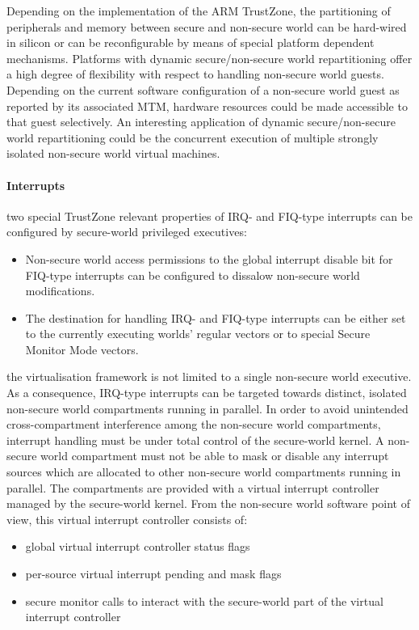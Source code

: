 \documentclass{article}
\begin{document}
Depending on the implementation of the ARM TrustZone, the partitioning of peripherals and memory between secure and non-secure world can be hard-wired in silicon or can be reconfigurable by means of special platform dependent mechanisms. Platforms with dynamic secure/non-secure world repartitioning offer a high degree of flexibility with respect to handling non-secure world guests. Depending on the current software configuration of a non-secure world guest as reported by its associated MTM, hardware resources could be made accessible to that guest selectively. An interesting application of dynamic secure/non-secure world repartitioning could be the concurrent execution of multiple strongly isolated non-secure world virtual machines.

\paragraph{Interrupts}

two special TrustZone relevant properties of IRQ- and FIQ-type interrupts can be configured by secure-world privileged executives: \begin{itemize}
\item Non-secure world access permissions to the global interrupt disable bit for FIQ-type interrupts can be configured to dissalow non-secure world modifications.
\item The destination for handling IRQ- and FIQ-type interrupts can be either set to the currently executing worlds’ regular vectors or to special Secure Monitor Mode vectors.
\end{itemize}

the virtualisation framework is not limited to a single non-secure world executive. As a consequence, IRQ-type interrupts can be targeted towards distinct, isolated non-secure world compartments running in parallel. In order to avoid unintended cross-compartment interference among the non-secure world compartments, interrupt handling must be under total control of the secure-world kernel. A non-secure world compartment must not be able to mask or disable any interrupt sources which are allocated to other non-secure world compartments running in parallel. The compartments are provided with a virtual interrupt controller managed by the secure-world kernel. From the non-secure world software point of view, this virtual interrupt controller consists of:\begin{itemize}
\item global virtual interrupt controller status flags
\item per-source virtual interrupt pending and mask flags
\item secure monitor calls to interact with the secure-world part of the virtual interrupt controller
\end{itemize}
\end{document}
